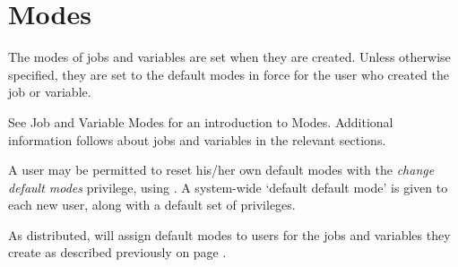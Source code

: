 \section{Modes}
The modes of jobs and variables are set when they are created. Unless otherwise specified, they are set to the default modes in force for the
user who created the job or variable.

See Job and Variable Modes for an introduction to Modes. Additional information follows about jobs and variables in the relevant sections.

A user may be permitted to reset his/her own default modes with the \textit{change default modes} privilege, using
. A system-wide `default default mode' is given to each new user, along with a default set of privileges.

As distributed, \ProductName{} will assign default modes to users for the jobs and variables they create as described previously on page \pageref{overview:defmodes}.

